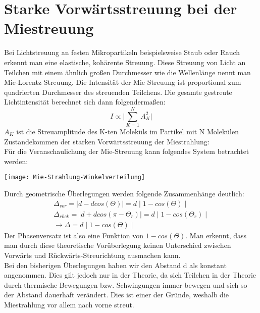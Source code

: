 \section{Starke Vorwärtsstreuung bei der Miestreuung}
Bei Lichtstreuung an festen Mikropartikeln beispielsweise Staub oder Rauch erkennt man eine elastische, kohärente Streuung. Diese Streuung von Licht an Teilchen mit einem ähnlich großen Durchmesser wie die Wellenlänge nennt man Mie-Lorentz Streuung. Die Intensität der Mie Streuung ist proportional zum quadrierten Durchmesser des streuenden Teilchens. Die gesamte gestreute Lichtintensität berechnet sich dann folgendermaßen:
\begin{equation}
I\propto \biggl| \sum_{K=1}^N A^2_K \biggl|
\end{equation}
$A_K$ ist die Streuamplitude des K-ten Moleküls im Partikel mit N Molekülen
Zustandekommen der starken Vorwärtsstreuung der Miestrahlung:\\
Für die Veranschaulichung der Mie-Streuung kann folgendes System betrachtet werden:\\
\begin{center}
    \texttt{[image: Mie-Strahlung-Winkelverteilung]}
\end{center}
Durch geometrische Überlegungen werden folgende Zusammenhänge deutlich:
\begin{align*}
\Delta_{vor}=\mid d-dcos(\Theta)\mid=d\mid 1-cos(\Theta) \mid\\
\Delta_{rück}=\mid d+dcos(\pi-\Theta_r)\mid=d\mid 1-cos(\Theta_r) \mid\\
\rightarrow \Delta = d\mid 1-cos(\Theta) \mid
\end{align*}
Der Phasenversatz ist also eine Funktion von $1-cos(\Theta)$.
Man erkennt, dass man durch diese theoretische Vorüberlegung keinen Unterschied zwischen Vorwärts und Rückwärts-Streurichtung ausmachen kann. \\
Bei den bisherigen Überlegungen haben wir den Abstand d als konstant angenommen. Dies gilt jedoch nur in der Theorie, da sich Teilchen in der Theorie durch thermische Bewegungen bzw. Schwingungen immer bewegen und sich so der Abstand dauerhaft verändert. Dies ist einer der Gründe, weshalb die Miestrahlung vor allem nach vorne streut. 
